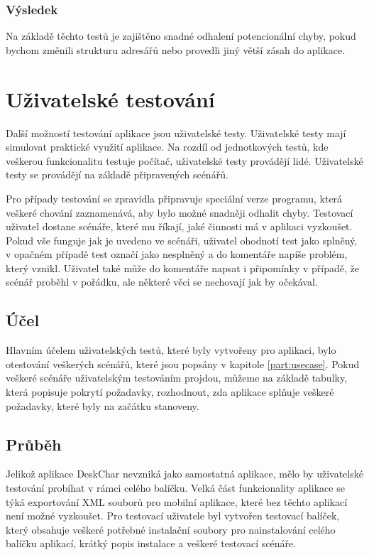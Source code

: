 \documentclass[thesis=B,czech]{resources/FITthesis}[2012/06/26]
\begin{document}
			\subsubsection*{Výsledek}
Na základě těchto testů je zajištěno snadné odhalení potencionální chyby, pokud bychom změnili strukturu adresářů nebo provedli jiný větší zásah do aplikace.

\section{Uživatelské testování}
Další možností testování aplikace jsou uživatelské testy. Uživatelské testy mají simulovat praktické využití aplikace. Na rozdíl od jednotkových testů, kde veškerou funkcionalitu testuje počítač, uživatelské testy provádějí lidé. Uživatelské testy se provádějí na základě připravených scénářů. \par

Pro případy testování se zpravidla připravuje speciální verze programu, která veškeré chování zaznamenává, aby bylo možné snadněji odhalit chyby. Testovací uživatel dostane scénáře, které mu říkají, jaké činnosti má v aplikaci vyzkoušet. Pokud vše funguje jak je uvedeno ve scénáři, uživatel ohodnotí test jako splněný, v opačném případě test označí jako nesplněný a do komentáře napíše problém, který vznikl. Uživatel také může do komentáře napsat i připomínky v případě, že scénář proběhl v pořádku, ale některé věci se nechovají jak by očekával. 

\subsection{Účel}
Hlavním účelem uživatelských testů, které byly vytvořeny pro aplikaci, bylo otestování veškerých scénářů, které jsou popsány v kapitole \ref{part:usecase}. Pokud veškeré scénáře uživatelským testováním projdou, můžeme na základě tabulky, která popisuje pokrytí požadavky, rozhodnout, zda aplikace splňuje veškeré požadavky, které byly na začátku stanoveny. 

\subsection{Průběh}
Jelikož aplikace DeskChar nevzniká jako samostatná aplikace, mělo by uživatelské testování probíhat v rámci celého balíčku. Velká část funkcionality aplikace se týká exportování XML souborů pro mobilní aplikace, které bez těchto aplikací není možné vyzkoušet. Pro testovací uživatele byl vytvořen testovací balíček, který obsahuje veškeré potřebné instalační soubory pro nainstalování celého balíčku aplikací, krátký popis instalace a veškeré testovací scénáře. \par
\end{document}
